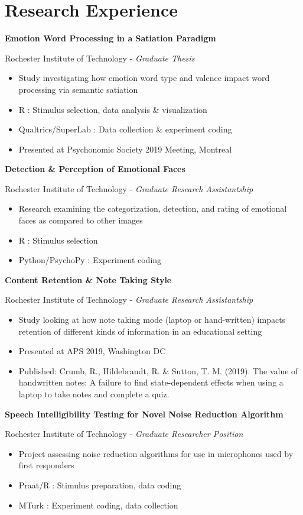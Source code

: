 \documentclass[a4paper,9pt]{extarticle}
\begin{document}
\section*{Research Experience}
\noindent\textbf{Emotion Word Processing in a Satiation Paradigm}

Rochester Institute of Technology - \textit{Graduate Thesis}
\begin{itemize}
\item Study investigating how emotion word type and valence impact word processing via semantic satiation
\item R : Stimulus selection, data analysis \& visualization
\item Qualtrics/SuperLab : Data collection \& experiment coding
\item Presented at Psychonomic Society 2019 Meeting, Montreal
\end{itemize}

\noindent\textbf{Detection \& Perception of Emotional Faces}

Rochester Institute of Technology - \textit{Graduate Research Assistantship}
\begin{itemize}
\item Research examining the categorization, detection, and rating of emotional faces as compared to other images
\item R : Stimulus selection
\item Python/PsychoPy : Experiment coding
\end{itemize}

\noindent\textbf{Content Retention \& Note Taking Style}

Rochester Institute of Technology - \textit{Graduate Research Assistantship}
\begin{itemize}
\item Study looking at how note taking mode (laptop or hand-written) impacts retention of different kinds of information in an educational setting
\item Presented at APS 2019, Washington DC
\item Published: Crumb, R., Hildebrandt, R. \& Sutton, T. M. (2019). The value of handwritten notes: A failure to find state-dependent effects when using a laptop to take notes and complete a quiz.
\end{itemize}

\noindent\textbf{Speech Intelligibility Testing for Novel Noise Reduction Algorithm}

Rochester Institute of Technology - \textit{Graduate Researcher Position}
\begin{itemize}
\item Project assessing noise reduction algorithms for use in microphones used by first responders
\item Praat/R : Stimulus preparation, data coding
\item MTurk : Experiment coding, data collection
\end{itemize}
\end{document}
